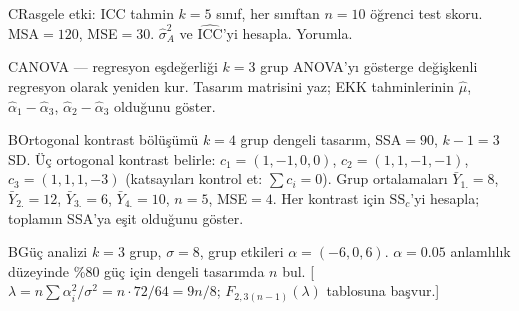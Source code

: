 \begin{alistirma}[Al.16.5]{C}{Rasgele etki: ICC tahmin}
$k=5$ sınıf, her sınıftan $n=10$ öğrenci test skoru. MSA$=120$, MSE$=30$. $\hat\sigma_A^2$ ve $\hat{\mathrm{ICC}}$'yi hesapla. Yorumla.
\end{alistirma}

\begin{alistirma}[Al.16.6]{C}{ANOVA --- regresyon eşdeğerliği}
$k=3$ grup ANOVA'yı gösterge değişkenli regresyon olarak yeniden kur. Tasarım matrisini yaz; EKK tahminlerinin $\hat\mu$, $\hat\alpha_1-\hat\alpha_3$, $\hat\alpha_2-\hat\alpha_3$ olduğunu göster.
\end{alistirma}

\begin{alistirma}[Al.16.7]{B}{Ortogonal kontrast bölüşümü}
$k=4$ grup dengeli tasarım, SSA$=90$, $k-1=3$ SD. Üç ortogonal kontrast belirle: $c_1=(1,-1,0,0)$, $c_2=(1,1,-1,-1)$, $c_3=(1,1,1,-3)$ (katsayıları kontrol et: $\sum c_i=0$). Grup ortalamaları $\bar Y_{1.}=8$, $\bar Y_{2.}=12$, $\bar Y_{3.}=6$, $\bar Y_{4.}=10$, $n=5$, MSE$=4$. Her kontrast için $\mathrm{SS}_{c}$'yi hesapla; toplamın SSA'ya eşit olduğunu göster.
\end{alistirma}

\begin{alistirma}[Al.16.8]{B}{Güç analizi}
$k=3$ grup, $\sigma=8$, grup etkileri $\alpha=(-6,0,6)$. $\alpha=0.05$ anlamlılık düzeyinde \%80 güç için dengeli tasarımda $n$ bul. [$\lambda=n\sum\alpha_i^2/\sigma^2=n\cdot72/64=9n/8$; $F_{2,3(n-1)}(\lambda)$ tablosuna başvur.]
\end{alistirma}

